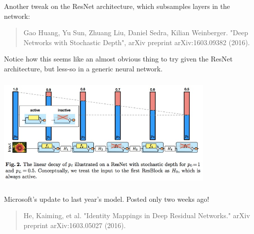 \documentclass[xetex,mathserif,serif,aspectratio=169]{beamer}
\begin{document}
\begin{frame}[fragile] \frametitle{} \oldB \small


Another tweak on the ResNet architecture, which subsamples
layers in the network:
\begin{quote}
Gao Huang, Yu Sun, Zhuang Liu, Daniel Sedra, Kilian Weinberger.
"Deep Networks with Stochastic Depth", arXiv preprint arXiv:1603.09382 (2016).
\end{quote}
Notice how this seems like an almost obvious thing to try
given the ResNet architecture, but less-so in a generic
neural network.

\end{frame}

\begin{frame}[fragile] \frametitle{} \oldB \small

\begin{center}
\includegraphics[width=0.8\textwidth]{img/sampleNet.jpg}
\end{center}

\end{frame}

\begin{frame}[fragile] \frametitle{} \oldB \small


Microsoft's update to last year's model. Posted only two
weeks ago!
\begin{quote}
He, Kaiming, et al. "Identity Mappings in Deep Residual Networks." arXiv preprint arXiv:1603.05027 (2016).
\end{quote}

\end{frame}
\end{document}
